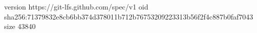 version https://git-lfs.github.com/spec/v1
oid sha256:71379832e8cb6bb374d378011b712b76753209223313b56f2f4c887b0faf7043
size 43840
